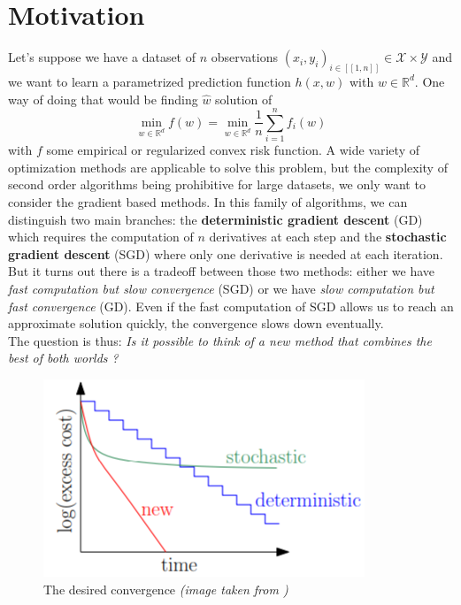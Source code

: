 \documentclass[12pt]{report}
\begin{document}
 
 

\maketitle

\section{Motivation}

Let's suppose we have a dataset of $n$ observations $(x_i, y_i)_{i \in
[\![1,n]\!]} \in \mathcal{X} \times \mathcal{Y}$ and we want to learn a
parametrized prediction function $h(x, w)$ with $w \in \mathbb{R}^d$. One way of
doing that would be finding $\hat{w}$ solution of
\begin{equation}
    \min_{w \in \mathbb{R}^d} f(w) = \min_{w \in \mathbb{R}^d} \dfrac{1}{n} \sum_{i=1}^n f_i(w)
\end{equation}
with $f$ some empirical or regularized convex risk function. A wide variety of
optimization methods are applicable to solve this problem, but the complexity of
second order algorithms being prohibitive for large datasets, we only want to
consider the gradient based methods. In this family of algorithms, we can
distinguish two main branches: the \textbf{deterministic gradient descent} (GD)
which requires the computation of $n$ derivatives at each step and the
\textbf{stochastic gradient descent} (SGD) where only one derivative is needed
at each iteration. \\
But it turns out there is a tradeoff between those two methods: either we have
\textit{fast computation but slow convergence} (SGD) or we have \textit{slow
computation but fast convergence} (GD). Even if the fast computation of SGD
allows us to reach an approximate solution quickly, the convergence slows down
eventually. \\
The question is thus: \textit{Is it possible to think of a new method that combines the best of both worlds ?}

\begin{figure}[h]
    \centering
    \includegraphics[scale=1]{Image/rates_optim.PNG}
    \caption{The desired convergence \textit{(image taken from \cite{slides})}}
    \label{fig:fig1}
\end{figure}
\end{document}
